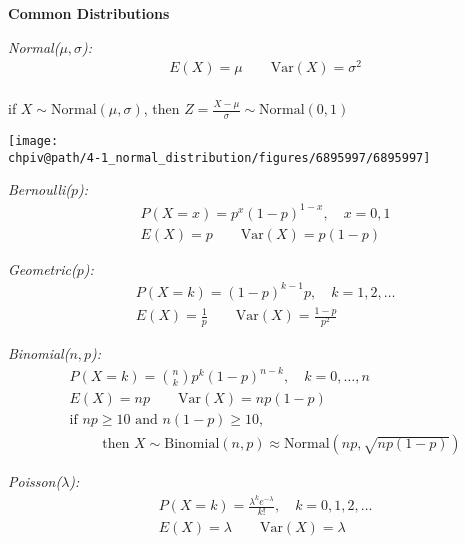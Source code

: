 \begin{multicols}{2}
\textbf{Common Distributions}

\textit{Normal($\mu,\sigma$):}
\begin{align*}
    &E(X) = \mu \qquad \mathrm{Var}(X) = \sigma^2 \\
\end{align*}

\vspace{-2em}
if $X \sim \text{Normal}(\mu, \sigma)$, then $Z = \frac{X - \mu}{\sigma} \sim \text{Normal}(0,1)$

\begin{center}
\texttt{[image: \\chpiv@path/4-1\_normal\_distribution/figures/6895997/6895997]}
\end{center}

\textit{Bernoulli($p$):}
\begin{align*}
    &P(X = x) = p^x (1-p)^{1-x},\quad x=0,1 \\
    &E(X) = p \qquad \mathrm{Var}(X) = p(1-p)
\end{align*}

\textit{Geometric($p$):}
\begin{align*}
    &P(X = k) = (1-p)^{k-1}p,\quad k=1,2,\ldots \\
    &E(X) = \frac{1}{p} \qquad \mathrm{Var}(X) = \frac{1-p}{p^2}
\end{align*}

\textit{Binomial($n,p$):}
\begin{align*}
    &P(X = k) = \binom{n}{k}p^k(1-p)^{n-k},\quad k=0,\ldots,n \\
    &E(X) = np \qquad \mathrm{Var}(X) = np(1-p)\\
    &\text{if } np \ge 10 \text{ and } n(1-p) \ge 10, \\
    &\hspace{2em}\text{ then } X \sim \text{Binomial}(n,p) \approx \text{Normal}(np, \sqrt{np(1-p)})
\end{align*}


\textit{Poisson($\lambda$):}
\begin{align*}
    &P(X = k) = \frac{\lambda^k e^{-\lambda}}{k!},\quad k=0,1,2,\ldots \\
    &E(X) = \lambda \qquad \mathrm{Var}(X) = \lambda
\end{align*}


\end{multicols} %

\vspace{1em}

